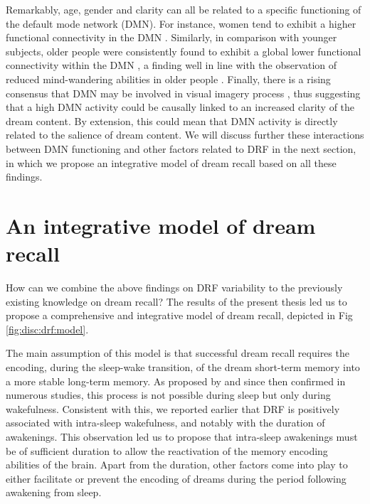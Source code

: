 Remarkably, age, gender and clarity can all be related to a specific functioning of the default mode network (DMN). For instance, women tend to exhibit a higher functional connectivity in the DMN \citep{bluhm_default_2008}. Similarly, in comparison with younger subjects, older people were consistently found to exhibit a global lower functional connectivity within the DMN \citep{damoiseaux_reduced_2008, koch_effects_2010}, a finding well in line with the observation of reduced mind-wandering abilities in older people \citep{jackson_mind-wandering_2012}. Finally, there is a rising consensus that DMN may be involved in visual imagery process \citep{andrews-hanna_functional-anatomic_2010}, thus suggesting that a high DMN activity could be causally linked to an increased clarity of the dream content. By extension, this could mean that DMN activity is directly related to the salience of dream content. We will discuss further these interactions between DMN functioning and other factors related to DRF in the next section, in which we propose an integrative model of dream recall based on all these findings.

\section{An integrative model of dream recall}
\label{disc:drf:model}

How can we combine the above findings on DRF variability to the previously existing knowledge on dream recall?
The results of the present thesis led us to propose a comprehensive and integrative model of dream recall, depicted in Fig \ref{fig:disc:drf:model}.

The main assumption of this model is that successful dream recall requires the encoding, during the sleep-wake transition, of the dream short-term memory into a more stable long-term memory. As proposed by \citet{koulack_dream_1976} and since then confirmed in numerous studies, this process is not possible during sleep but only during wakefulness. Consistent with this, we reported earlier that DRF is positively associated with intra-sleep wakefulness, and notably with the duration of awakenings. This observation led us to propose that intra-sleep awakenings must be of sufficient duration to allow the reactivation of the memory encoding abilities of the brain. Apart from the duration, other factors come into play to either facilitate or prevent the encoding of dreams during the period following awakening from sleep.

